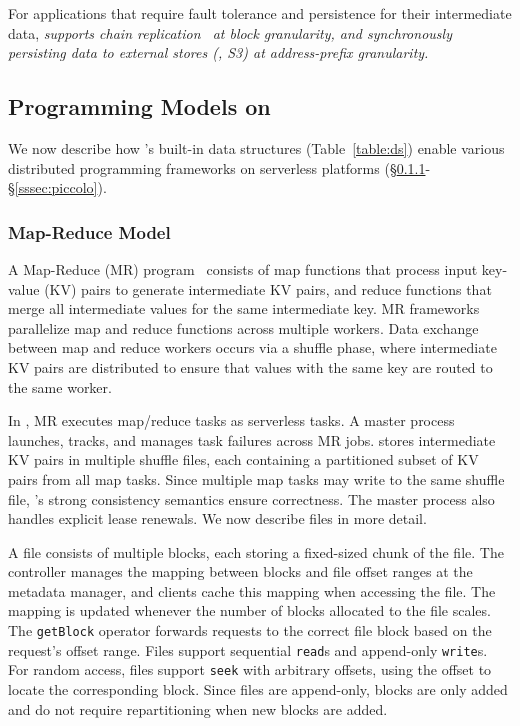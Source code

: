 For applications that require fault tolerance and persistence for their intermediate data, \sl supports chain replication~\cite{chainreplication} at block granularity, and synchronously persisting data to external stores (\eg, S3) at address-prefix granularity.


\subsection{Programming Models on \jiffy}
\label{ssec:jiffymodels}

We now describe how \jiffy's built-in data structures (Table~\ref{table:ds}) enable various distributed programming frameworks on serverless platforms (\S\ref{sssec:bsp}-\S\ref{sssec:piccolo}).

\subsubsection{Map-Reduce Model}
\label{sssec:bsp}

A Map-Reduce (MR) program~\cite{mapreduce} consists of map functions that process input key-value (KV) pairs to generate intermediate KV pairs, and reduce functions that merge all intermediate values for the same intermediate key. MR frameworks~\cite{mapreduce, hadoop, spark} parallelize map and reduce functions across multiple workers. Data exchange between map and reduce workers occurs via a shuffle phase, where intermediate KV pairs are distributed to ensure that values with the same key are routed to the same worker.

In \jiffy, MR executes map/reduce tasks as serverless tasks. A master process launches, tracks, and manages task failures across MR jobs. \jiffy stores intermediate KV pairs in multiple shuffle files, each containing a partitioned subset of KV pairs from all map tasks. Since multiple map tasks may write to the same shuffle file, \jiffy's strong consistency semantics ensure correctness. The master process also handles explicit lease renewals. We now describe \jiffy files in more detail.

 A \jiffy file consists of multiple blocks, each storing a fixed-sized chunk of the file. The controller manages the mapping between blocks and file offset ranges at the metadata manager, and clients cache this mapping when accessing the file. The mapping is updated whenever the number of blocks allocated to the file scales. The \texttt{getBlock} operator forwards requests to the correct file block based on the request's offset range. Files support sequential \texttt{read}s and append-only \texttt{write}s. For random access, files support \texttt{seek} with arbitrary offsets, using the offset to locate the corresponding block. Since files are append-only, blocks are only added and do not require repartitioning when new blocks are added.

